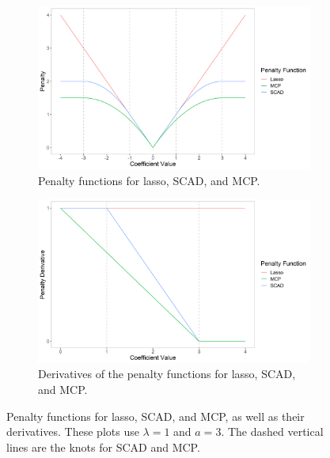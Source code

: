 \documentclass{article}
\begin{document}
\begin{figure}[!h]
	\centering
	\begin{subfigure}[b]{0.45\textwidth}
		\includegraphics[width=\textwidth]{images/lasso-scad-mcp-penalty.png}
		\captionsetup{width = 0.8\textwidth}
		\caption{Penalty functions for lasso, SCAD, and MCP.}
		\label{fig:penalty}
	\end{subfigure}
	\hspace{30pt}
	\begin{subfigure}[b]{0.45\textwidth}
		\includegraphics[width=\textwidth]{images/lasso-scad-mcp-derivative.png}
		\captionsetup{width = 0.8\textwidth}
		\caption{Derivatives of the penalty functions for lasso, SCAD, and MCP.}
		\label{fig:derivative}
	\end{subfigure}
	\captionsetup{width = 0.9\textwidth}
	\caption{Penalty functions for lasso, SCAD, and MCP, as well as their derivatives. These plots use $\lambda = 1$ and $a = 3$. The dashed vertical lines are the knots for SCAD and MCP.}
	\label{fig:lasso-scad-mcp}
\end{figure}
\end{document}
